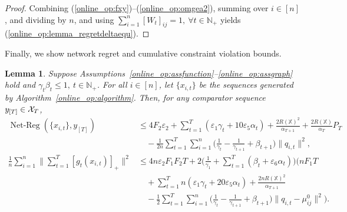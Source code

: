\documentclass[12pt,draftcls,onecolumn]{IEEEtran}%
\newtheorem{lemma}{Lemma}
\DeclareMathOperator{\NetReg}{Net-Reg}
\begin{document}
\begin{proof}
Combining (\ref{online_op:fxy})--(\ref{online_op:omgea2}), summing over $i\in[n]$, and dividing by $n$, and using $\sum_{i=1}^n[W_t]_{ij}=1,~\forall t\in\mathbb{N}_+$ yields
 (\ref{online_op:lemma_regretdeltaequ}).
\end{proof}




Finally,  we show network regret and cumulative constraint violation bounds.
\begin{lemma}\label{online_op:theoremreg}
Suppose Assumptions~\ref{online_op:assfunction}--\ref{online_op:assgraph} hold and $\gamma_{t}\beta_{t}\le1,~t\in\mathbb{N}_+$. For all $i\in[n]$, let $\{x_{i,t}\}$ be the sequences generated by Algorithm~\ref{online_op:algorithm}. Then, for any comparator sequence $y_{[T]}\in{\mathcal{X}}_{T}$,
\begin{align}
\NetReg(\{x_{i,t}\},y_{[T]})
&\le 4F_2\varepsilon_2
+\sum_{t=1}^T(\varepsilon_1\gamma_{t}
+10\varepsilon_5\alpha_{t})+\frac{2R(\mathbb{X})^2}{\alpha_{T+1}}
+\frac{2R(\mathbb{X})}{\alpha_{T}}P_T\nonumber\\
&\quad
-\frac{1}{2n}\sum_{t=1}^T\sum_{i=1}^n\Big(\frac{1}{\gamma_{t}}
-\frac{1}{\gamma_{t+1}}+\beta_{t+1}\Big)\|q_{i,t}\|^2,\label{online_op:theoremregequ}\\
\frac{1}{n}\sum_{i=1}^n\Big\|\sum_{t=1}^T[g_{t}(x_{i,t})]_+\Big\|^2
&\le 4n\varepsilon_2F_1F_2T+2\Big(\frac{1}{\gamma_1}
+\sum_{t=1}^T(\beta_{t}+\varepsilon_6\alpha_{t})\Big)
\Big(nF_1T\nonumber\\
&\quad
+\sum_{t=1}^Tn(\varepsilon_1\gamma_{t}
+20\varepsilon_5\alpha_{t})+\frac{2nR(\mathbb{X})^2}{\alpha_{T+1}}\nonumber\\
&\quad
-\frac{1}{2}\sum_{t=1}^T\sum_{i=1}^n\Big(\frac{1}{\gamma_{t}}
-\frac{1}{\gamma_{t+1}}+\beta_{t+1}\Big)\|q_{i,t}-\mu_{ij}^0\|^2\Big).
\label{online_op:theoremconsequ}
\end{align}
\end{lemma}
\end{document}
